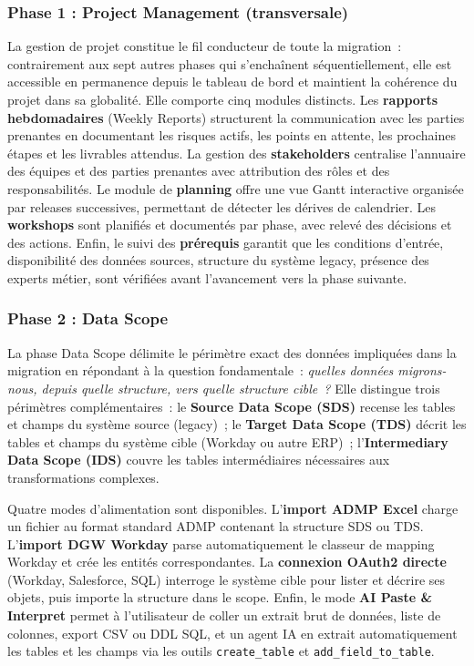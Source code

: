 \subsubsection*{Phase 1 : Project Management (transversale)}
\label{subsubsec:phase-pm}

La gestion de projet constitue le fil conducteur de toute la migration~: contrairement aux sept autres phases qui s'enchaînent séquentiellement, elle est accessible en permanence depuis le tableau de bord et maintient la cohérence du projet dans sa globalité. Elle comporte cinq modules distincts. Les \textbf{rapports hebdomadaires} (Weekly Reports) structurent la communication avec les parties prenantes en documentant les risques actifs, les points en attente, les prochaines étapes et les livrables attendus. La gestion des \textbf{stakeholders} centralise l'annuaire des équipes et des parties prenantes avec attribution des rôles et des responsabilités. Le module de \textbf{planning} offre une vue Gantt interactive organisée par releases successives, permettant de détecter les dérives de calendrier. Les \textbf{workshops} sont planifiés et documentés par phase, avec relevé des décisions et des actions. Enfin, le suivi des \textbf{prérequis} garantit que les conditions d'entrée, disponibilité des données sources, structure du système legacy, présence des experts métier, sont vérifiées avant l'avancement vers la phase suivante.

\subsubsection*{Phase 2 : Data Scope}
\label{subsubsec:phase-ds}

La phase Data Scope délimite le périmètre exact des données impliquées dans la migration en répondant à la question fondamentale~: \textit{quelles données migrons-nous, depuis quelle structure, vers quelle structure cible~?} Elle distingue trois périmètres complémentaires~: le \textbf{Source Data Scope (SDS)} recense les tables et champs du système source (legacy)~; le \textbf{Target Data Scope (TDS)} décrit les tables et champs du système cible (Workday ou autre ERP)~; l'\textbf{Intermediary Data Scope (IDS)} couvre les tables intermédiaires nécessaires aux transformations complexes.

Quatre modes d'alimentation sont disponibles. L'\textbf{import ADMP Excel} charge un fichier au format standard ADMP contenant la structure SDS ou TDS. L'\textbf{import DGW Workday} parse automatiquement le classeur de mapping Workday et crée les entités correspondantes. La \textbf{connexion OAuth2 directe} (Workday, Salesforce, SQL) interroge le système cible pour lister et décrire ses objets, puis importe la structure dans le scope. Enfin, le mode \textbf{AI Paste \& Interpret} permet à l'utilisateur de coller un extrait brut de données, liste de colonnes, export CSV ou DDL SQL, et un agent IA en extrait automatiquement les tables et les champs via les outils \texttt{create\_table} et \texttt{add\_field\_to\_table}.

